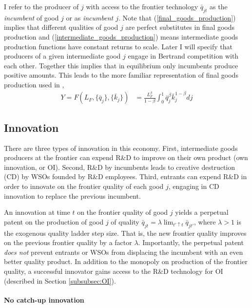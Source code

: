 \documentclass[11pt,english]{article}
\theoremstyle{remark}
\begin{document}
I refer to the producer of $j$ with access to the frontier technology $\bar{q}_{jt}$ as the \textit{incumbent} of good $j$ or as \textit{incumbent $j$}. Note that (\ref{final_goods_production}) implies that different qualities of good $j$ are perfect substitutes in final goods production and (\ref{intermediate_goods_production}) means intermediate goods production functions have constant returns to scale. Later I will specify that producers of a given intermediate good $j$ engage in Bertrand competition with each other. Together this implies that in equilibrium only incumbents produce positive amounts. This leads to the more familiar representation of final goods production used in  \cite{acemoglu_introduction_2009},
\begin{align}
	Y = F(L_F,\{\bar{q}_j\},\{\bar{k}_j\}) &= \frac{L_F^{\beta}}{1-\beta} \int_0^1 \bar{q}_j^{\beta} \bar{k}_j^{1-\beta} dj  \label{eq_final_goods_production}
\end{align}

\subsection{Innovation}\label{subsec:innovation}

There are three types of innovation in this economy. First, intermediate goods producers at the frontier can expend R\&D to improve on their own product (own innovation, or OI). Second, R\&D by incumbents leads to creative destruction (CD) by WSOs founded by R\&D employees. Third, entrants can expend R\&D in order to innovate on the frontier quality of each good $j$, engaging in CD innovation to replace the previous incumbent.

An innovation at time $t$ on the frontier quality of good $j$ yields a perpetual patent on the production of good $j$ of quality $\bar{q}_{jt} = \lambda \lim_{t' \uparrow t} \bar{q}_{jt'}$, where $\lambda > 1$ is the exogenous quality ladder step size. That is, the new frontier quality improves on the previous frontier quality by a factor $\lambda$. Importantly, the perpetual patent \textit{does not} prevent entrants or WSOs from displacing the incumbent with an even better quality product. In addition to the monopoly on production of the frontier quality, a successful innovator gains access to the R\&D technology for OI (described in Section \ref{subsubsec:OI}).

\paragraph{No catch-up innovation}
\end{document}
